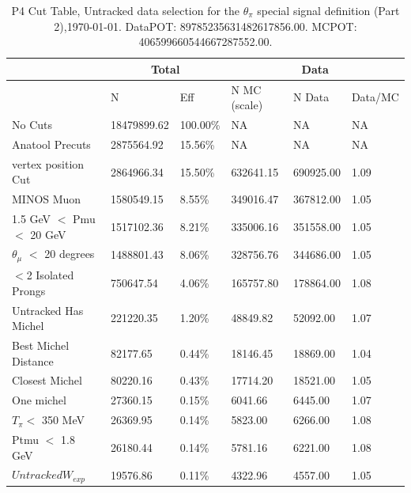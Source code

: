 \begin{table}[!hbt]
    \tiny
    \centering
    \begin{tabular}{|*{6}{l|}}


    \hline
    & \multicolumn{2}{c|}{Total} & \multicolumn{3}{c|}{Data} \\
    \hline
&  N         & Eff     & N MC (scale) & N Data    & Data/MC \\\hline
 No Cuts   & 18479899.62 & 100.00\% & NA & NA & NA \\ \hline
 Anatool Precuts  & 2875564.92 &  15.56\% & NA & NA & NA \\ \hline
 vertex position Cut    & 2864966.34     &  15.50\% & 632641.15     & 690925.00 &   1.09 \\ \hline
 MINOS Muon    & 1580549.15     &   8.55\% & 349016.47     & 367812.00 &   1.05 \\ \hline
 1.5 GeV $<$ Pmu $<$ 20 GeV & 1517102.36     &   8.21\% & 335006.16     & 351558.00 &   1.05 \\ \hline
 $\theta_{\mu}$ $<$ 20 degrees & 1488801.43     &   8.06\% & 328756.76     & 344686.00 &   1.05 \\ \hline
 $<$2 Isolated Prongs   & 750647.54     &   4.06\% & 165757.80     & 178864.00 &   1.08 \\ \hline
 Untracked Has Michel    & 221220.35     &   1.20\% & 48849.82     & 52092.00 &   1.07 \\ \hline
 Best Michel Distance    & 82177.65     &   0.44\% & 18146.45     & 18869.00 &   1.04 \\ \hline
 Closest Michel   & 80220.16     &   0.43\% & 17714.20     & 18521.00 &   1.05 \\ \hline
 One michel    & 27360.15     &   0.15\% & 6041.66     & 6445.00 &   1.07 \\ \hline
 $T_\pi<$ 350 MeV  & 26369.95     &   0.14\% & 5823.00     & 6266.00 &   1.08 \\ \hline
 Ptmu $<$ 1.8 GeV  & 26180.44     &   0.14\% & 5781.16     & 6221.00 &   1.08 \\ \hline
 $Untracked W_{exp}$  & 19576.86     &   0.11\% & 4322.96     & 4557.00 &   1.05 \\ \hline
    \end{tabular}
    \caption{P4 Cut Table, Untracked data selection for the $\theta_\pi$ special signal definition (Part 2),\today. DataPOT: 89785235631482617856.00. MCPOT: 406599660544667287552.00.}
    \label{tab:Analysis:Cuts:UntrackedCutTableThetapi2}
\end{table}


